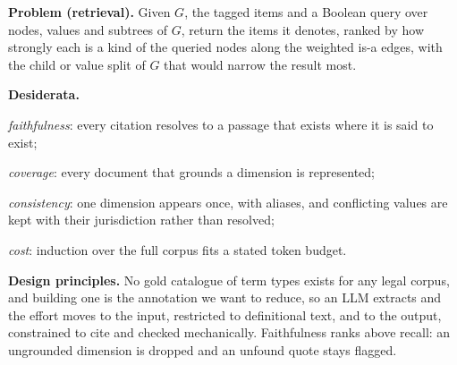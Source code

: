 \textbf{Problem (retrieval).} Given $G$, the tagged items and a Boolean
query over nodes, values and subtrees of $G$, return the items it denotes,
ranked by how strongly each is a kind of the queried nodes along the weighted
is-a edges, with the child or value split of $G$ that would narrow the result most.

\textbf{Desiderata.}
\begin{enumerate*}[label=(D\arabic*)]
  \item \emph{faithfulness}: every citation resolves to a passage that exists
    where it is said to exist;
  \item \emph{coverage}: every document that grounds a dimension is represented;
  \item \emph{consistency}: one dimension appears once, with aliases, and
    conflicting values are kept with their jurisdiction rather than resolved;
  \item \emph{cost}: induction over the full corpus fits a stated token budget.
\end{enumerate*}

\textbf{Design principles.} No gold catalogue of term types exists for any
legal corpus, and building one is the annotation we want to reduce, so an LLM
extracts and the effort moves to the input, restricted to definitional text,
and to the output, constrained to cite and checked mechanically. Faithfulness
ranks above recall: an ungrounded dimension is dropped and an unfound quote
stays flagged.
